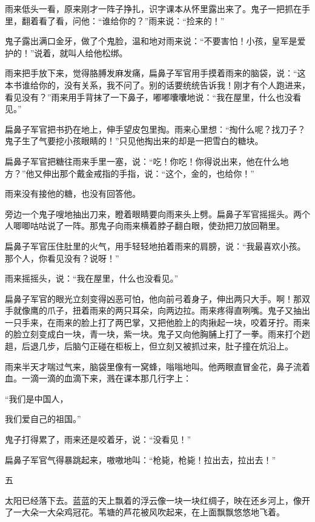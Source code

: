 \documentclass[12pt,UTF-8,openany]{ctexbook}
\begin{document}
\begin{Large}
    雨来低头一看，原来刚才一阵子挣扎，识字课本从怀里露出来了。鬼子一把抓在手里，翻着看了看，问他：“谁给你的？”雨来说：“捡来的！”
    
    鬼子露出满口金牙，做了个鬼脸，温和地对雨来说：“不要害怕！小孩，皇军是爱护的！”说着，就叫人给他松绑。
    
    雨来把手放下来，觉得胳膊发麻发痛，扁鼻子军官用手摸着雨来的脑袋，说：“这本书谁给你的，没有关系，我不问了。别的话要统统告诉我！刚才有个人跑进来，看见没有？”雨来用手背抹了一下鼻子，嘟嘟囔囔地说：“我在屋里，什么也没看见。”
    
    扁鼻子军官把书扔在地上，伸手望皮包里掏。雨来心里想：“掏什么呢？找刀子？鬼子生了气要挖小孩眼睛的！”只见他掏出来的却是一把雪白的糖块。
    
    扁鼻子军官把糖往雨来手里一塞，说：“吃！你吃！你得说出来，他在什么地方？”他又伸出那个戴金戒指的手指，说：“这个，金的，也给你！”
    
    雨来没有接他的糖，也没有回答他。
    
    旁边一个鬼子嗖地抽出刀来，瞪着眼睛要向雨来头上劈。扁鼻子军官摇摇头。两个人唧唧咕咕说了一阵。那鬼子向雨来横着脖子翻白眼，使劲把刀放回鞘里。
    
    扁鼻子军官压住肚里的火气，用手轻轻地拍着雨来的肩膀，说：“我最喜欢小孩。那个人，你看见没有？说呀！”
    
    雨来摇摇头，说：“我在屋里，什么也没看见。”
    
    扁鼻子军官的眼光立刻变得凶恶可怕，他向前弓着身子，伸出两只大手。啊！那双手就像鹰的爪子，扭着雨来的两只耳朵，向两边拉。雨来疼得直咧嘴。鬼子又抽出一只手来，在雨来的脸上打了两巴掌，又把他脸上的肉揪起一块，咬着牙拧。雨来的脸立刻变成白一块，青一块，紫一块。鬼子又向他胸脯上打了一拳。雨来打个趔趄，后退几步，后脑勺正碰在柜板上，但立刻又被抓过来，肚子撞在炕沿上。
    
    雨来半天才喘过气来，脑袋里像有一窝蜂，嗡嗡地叫。他两眼直冒金花，鼻子流着血。一滴一滴的血滴下来，溅在课本那几行字上：
    
    “我们是中国人，
    
    我们爱自己的祖国。”
    
    鬼子打得累了，雨来还是咬着牙，说：“没看见！”
    
    扁鼻子军官气得暴跳起来，嗷嗷地叫：“枪毙，枪毙！拉出去，拉出去！”
    
    五
    
    太阳已经落下去。蓝蓝的天上飘着的浮云像一块一块红绸子，映在还乡河上，像开了一大朵一大朵鸡冠花。苇塘的芦花被风吹起来，在上面飘飘悠悠地飞着。
    

\end{Large}
\end{document}
